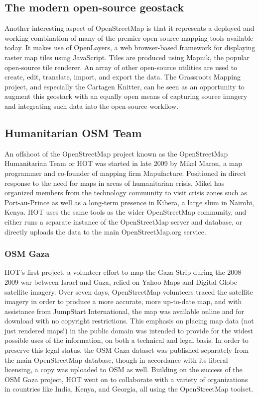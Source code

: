 \documentclass[11pt,oneside,notitlepage]{report}
\begin{document}
\subsection{The modern open-source geostack}

Another interesting aspect of OpenStreetMap is that it represents a deployed and working combination of many of the premier open-source mapping tools available today. It makes use of OpenLayers, a web browser-based framework for displaying raster map tiles using JavaScript. Tiles are produced using Mapnik, the popular open-source tile renderer. An array of other open-source utilities are used to create, edit, translate, import, and export the data. The Grassroots Mapping project, and especially the Cartagen Knitter, can be seen as an opportunity to augment this geostack with an equally open means of capturing source imagery and integrating such data into the open-source workflow. 

\subsection{Humanitarian OSM Team}
 
An offshoot of the OpenStreetMap project known as the OpenStreetMap Humanitarian Team or \ac{HOT} was started in late 2009 by Mikel Maron, a map programmer and co-founder of mapping firm Mapufacture. Positioned in direct response to the need for maps in areas of humanitarian crisis, Mikel has organized members from the technology community to visit crisis zones such as Port-au-Prince as well as a long-term presence in Kibera, a large slum in Nairobi, Kenya. \ac{HOT} uses the same tools as the wider OpenStreetMap community, and either runs a separate instance of the OpenStreetMap server and database, or directly uploads the data to the main OpenStreetMap.org service. \cite{osm2010hot} 

\subsubsection{OSM Gaza}

\ac{HOT}'s first project, a volunteer effort to map the Gaza Strip during the 2008-2009 war between Israel and Gaza, relied on Yahoo Maps and Digital Globe satellite imagery. Over seven days, OpenStreetMap volunteers traced the satellite imagery in order to produce a more accurate, more up-to-date map, and with assistance from JumpStart International, the map was available online and for download with no copyright restrictions. \cite{chilton-crowdsourcing} This emphasis on placing map data (not just rendered maps!) in the public domain was intended to provide for the widest possible uses of the information, on both a technical and legal basis. In order to preserve this legal status, the OSM Gaza dataset was published separately from the main OpenStreetMap database, though in accordance with its liberal licensing, a copy was uploaded to OSM as well. Building on the success of the OSM Gaza project, \ac{HOT} went on to collaborate with a variety of organizations in countries like India, Kenya, and Georgia, all using the OpenStreetMap toolset. 
\end{document}
